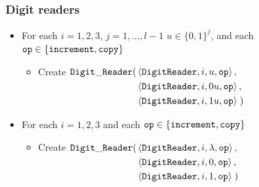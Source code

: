     \subsubsection{ Digit readers }
        \begin{itemize}
            \item For each $i = 1,2,3$,
                           $j = 1,\ldots,l-1$
                           $u \in \{0, 1\}^j$,
                           and each ${\tt op} \in \{{\tt increment}, {\tt copy} \}$

                \begin{itemize}
                \item Create
                    $\begin{aligned}[t]
                        {\tt Digit\_Reader}(& \left\langle {\tt DigitReader}, i, u, {\tt op} \right\rangle, \\
                                 & \left\langle {\tt DigitReader}, i, 0u, {\tt op} \right\rangle, \\
                                 & \left\langle {\tt DigitReader}, i, 1u, {\tt op} \right\rangle \;)
                    \end{aligned}$
                \end{itemize}

            \item For each $i = 1,2,3$ and each ${\tt op} \in \{{\tt increment}, {\tt copy} \}$

                \begin{itemize}
                \item Create
                    $\begin{aligned}[t]
                        {\tt Digit\_Reader}(& \left\langle {\tt DigitReader}, i, \lambda, {\tt op} \right\rangle, \\
                                 & \left\langle {\tt DigitReader}, i, 0, {\tt op} \right\rangle, \\
                                 & \left\langle {\tt DigitReader}, i, 1, {\tt op} \right\rangle \;)
                    \end{aligned}$
                \end{itemize}



        \end{itemize}

